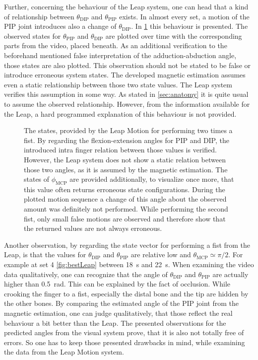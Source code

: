 Further, concerning the behaviour of the Leap system, one can head that a kind of relationship between $ \theta_{\mathrm{DIP}} $ and $ \theta_{\mathrm{PIP}} $ exists. In almost every set, a motion of the \ac{PIP} joint introduces also a change of $ \theta_{\mathrm{DIP}} $. In \ref{fig:set14} this behaviour is presented. The observed states for $ \theta_{\mathrm{PIP}} $ and $ \theta_{\mathrm{DIP}} $ are plotted over time with the corresponding parts from the video, placed beneath. As an additional verification to the beforehand mentioned false interpretation of the adduction-abduction angle, those states are also plotted. This observation should not be stated to be false or introduce erroneous system states. The developed magnetic estimation assumes even a static relationship between those two state values. The Leap system verifies this assumption in some way. As stated in \ref{sec:anatomy} it is quite usual to assume the observed relationship. However, from the information available for the Leap, a hard programmed explanation of this behaviour is not provided.\\
\begin{figure}[!htb]
\centering
{}
\caption[Relationship between $ \theta_{\mathrm{PIP}} $ and $ \theta_{\mathrm{DIP}} $ observed by Leap Motion]
{The states, provided by the Leap Motion for performing two times a fist. By regarding the flexion-extension angles for \ac{PIP} and \ac{DIP}, the introduced intra finger relation between those values is verified. However, the Leap system does not show a static relation between those two angles, as it is assumed by the magnetic estimation. The states of $ \phi_{\mathrm{MCP}} $ are provided additionally, to visualize once more, that this value often returns erroneous state configurations. During the plotted motion sequence a change of this angle about the observed amount was definitely not performed. While performing the second fist, only small false motions are observed and therefore show that the returned values are not always erroneous.}
\label{fig:set14}
\end{figure}
Another observation, by regarding the state vector for performing a fist from the Leap, is that the values for $ \theta_{\mathrm{DIP}} $ and $ \theta_{\mathrm{PIP}} $ are relative low and $ \theta_{\mathrm{MCP}} \simeq \pi/2 $. For example at set 4 \ref{fig:bestLeap} between \SI{18}{\second} and \SI{22}{\second}. When examining the video data qualitatively, one can recognize that the angle of $ \theta_{\mathrm{DIP}} $ and $ \theta_{\mathrm{PIP}} $ are actually higher than \SI{0.5}{\radian}. This can be explained by the fact of occlusion. While crooking the finger to a fist, especially the distal bone and the tip are hidden by the other bones. By comparing the estimated angle of the \ac{PIP} joint from the magnetic estimation, one can judge qualitatively, that those reflect the real behaviour a bit better than the Leap. The presented observations for the predicted angles from the visual system prove, that it is also not totally free of errors. So one has to keep those presented drawbacks in mind, while examining the data from the Leap Motion system.
\FloatBarrier


